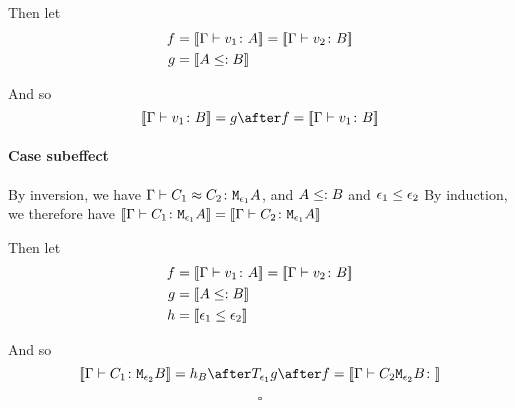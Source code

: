 {Then let
\begin{align}
    f &{}={\bf [\![}\Gamma \vdash v_1 \colon A{\bf ]\!]} = {\bf [\![}\Gamma \vdash v_2 \colon B{\bf ]\!]}\\
    g &{}={\bf [\![}A \leq: B{\bf ]\!]}
\end{align}



And so
\begin{equation}
        \deno{\gtyperelation{v_1}{B}} = g \after f = \deno{\gtyperelation{v_1}{B}}
\end{equation}
\paragraph{Case subeffect}
By inversion, we have $\Gamma \vdash C_1 \approx C_2 \colon \texttt{M}_{\epsilon_1}{A}$, and $A \leq: B$ and $\epsilon_1 \leq \epsilon_2$
By induction, we therefore have ${\bf [\![}\Gamma \vdash C_1 \colon \texttt{M}_{\epsilon_1}{A}{\bf ]\!]} = {\bf [\![}\Gamma \vdash C_2 \colon \texttt{M}_{\epsilon_1}{A}{\bf ]\!]}$

Then let
\begin{align}
    f &{}=\deno{\gtyperelation{v_1}{A}} = \deno{\gtyperelation{v_2}{B}}\\
    g &{}=\deno{A \subtype B}\\
    h &{}=\deno{\e_1\subeffect\e_2}
\end{align}

And so
\begin{equation}
        \deno{\gtyperelation{C_1}{\M{\e_2}{B}}} = h_B \after \T{\e_1}{g} \after f = \deno{\gtyperelation{C_2{\M{\e_2}{B}}}}
\end{equation}

$$\square$$
}

\ifdefined\NoDocument
\else
\documentclass{report}





   \BetaEtaEquivalence

\fi